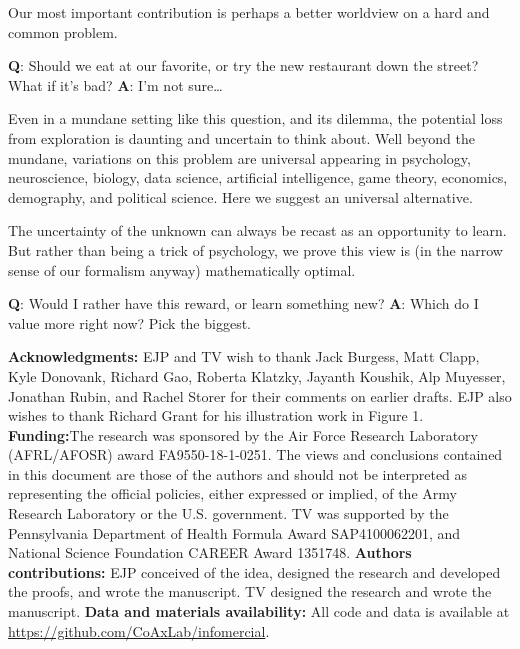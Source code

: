 \documentclass[12pt]{article}
\begin{document}
Our most important contribution is perhaps a better worldview on a hard and common problem.

\textbf{Q}: Should we eat at our favorite, or try the new restaurant down the street? What if it's bad?
\textbf{A}: I'm not sure\ldots

Even in a mundane setting like this question, and its dilemma, the potential loss from exploration is daunting and uncertain to think about. Well beyond the mundane, variations on this problem are universal appearing in psychology, neuroscience, biology, data science, artificial intelligence, game theory, economics, demography, and political science. Here we suggest an universal alternative.

The uncertainty of the unknown can always be recast as an opportunity to learn. But rather than being a trick of psychology, we prove this view is (in the narrow sense of our formalism anyway) mathematically optimal.

\textbf{Q}: Would I rather have this reward, or learn something new? 
\textbf{A}: Which do I value more right now? Pick the biggest.




\textbf{Acknowledgments:} EJP and TV wish to thank Jack Burgess, Matt Clapp, Kyle Donovank, Richard Gao, Roberta Klatzky, Jayanth Koushik, Alp Muyesser, Jonathan Rubin, and Rachel Storer for their comments on earlier drafts. EJP also wishes to thank Richard Grant for his illustration work in Figure 1. \textbf{Funding:}The research was sponsored by the Air Force Research Laboratory (AFRL/AFOSR) award FA9550-18-1-0251. The views and conclusions contained in this document are those of the authors and should not be interpreted as representing the official policies, either expressed or implied, of the Army Research Laboratory or the U.S. government. TV was supported by the Pennsylvania Department of Health Formula Award SAP4100062201, and National Science Foundation CAREER Award 1351748. \textbf{Authors contributions:} EJP conceived of the idea, designed the research and developed the proofs, and wrote the manuscript. TV designed the research and wrote the manuscript. \textbf{Data and materials availability:} All code and data is available at \url{https://github.com/CoAxLab/infomercial}.

 

\end{document}
